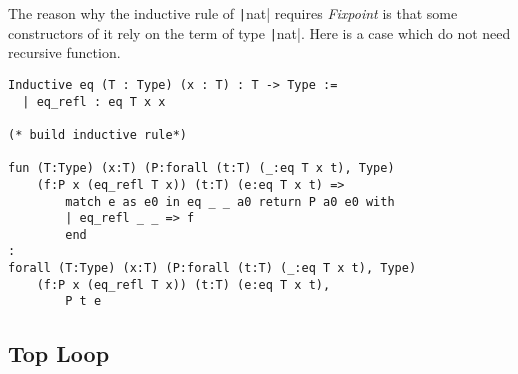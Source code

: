 The reason why the inductive rule of \texttt|nat| requires {\it Fixpoint} is that some constructors of it
rely on the term of type \texttt|nat|. Here is a case which do not need recursive function.
\begin{center}
\begin{verbatim}
Inductive eq (T : Type) (x : T) : T -> Type :=
  | eq_refl : eq T x x

(* build inductive rule*)

fun (T:Type) (x:T) (P:forall (t:T) (_:eq T x t), Type) 
    (f:P x (eq_refl T x)) (t:T) (e:eq T x t) => 
        match e as e0 in eq _ _ a0 return P a0 e0 with 
        | eq_refl _ _ => f
        end
: 
forall (T:Type) (x:T) (P:forall (t:T) (_:eq T x t), Type) 
    (f:P x (eq_refl T x)) (t:T) (e:eq T x t),
        P t e
\end{verbatim}
\end{center}


\subsection{Top Loop}
